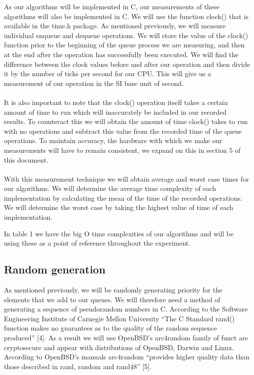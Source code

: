 \documentclass[12pt]{article}
\begin{document}
As our algorithms will be implemented in C, our measurements of these algorithms will also be implemented in C. We will use the function clock() that is available in the time.h package. As mentioned previously, we will measure individual enqueue and dequeue operations. We will store the value of the clock() function prior to the beginning of the queue process we are measuring, and then at the end after the operation has successfully been executed. We will find the difference between the clock values before and after our operation and then divide it by the number of ticks per second for our CPU.  This will give us a measurement of our operation in the SI base unit of second.
\\
\\
It is also important to note that the clock() operation itself takes a certain amount of time to run which will inaccurately be included in our recorded results. To counteract this we will obtain the amount of time clock()  takes to run with no operations and subtract this value from the recorded time of the queue operations. To maintain accuracy, the hardware with which we make our measurements will have to remain consistent, we expand on this in section 5 of this document. 
\\
\\
With this measurement technique we will obtain average and worst case times for our algorithms. We will determine the average time complexity of each implementation by calculating the mean of the time of the recorded operations. We will determine the worst case by taking the highest value of time of each implementation.

In table 1 we have the big O time complexities of our algorithms and will be using these as a point of reference throughout the experiment.    

\subsection{Random generation}

As mentioned previously, we will be randomly generating priority for the elements that we add to our queues. We will therefore need a method of generating a sequence of pseudorandom numbers in C. According to the Software Engineering Institute of Carnegie Mellon University “The C Standard rand() function makes no guarantees as to the quality of the random sequence produced” [4]. As a result we will use OpenBSD’s arc4random family of funct are cryptosecure and appear with distributions of OpenBSD, Darwin and Linux. According to OpenBSD’s manuals arc4random “provides higher quality data than those described in rand, random and rand48” [5]. 
\end{document}
